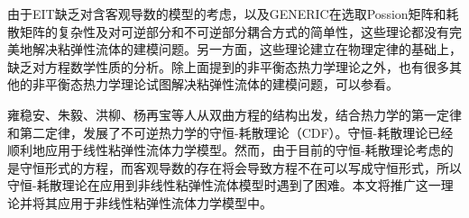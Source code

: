 由于EIT缺乏对含客观导数的模型的考虑，以及GENERIC在选取Possion矩阵和耗散矩阵的复杂性及对可逆部分和不可逆部分耦合方式的简单性，这些理论都没有完美地解决粘弹性流体的建模问题。另一方面，这些理论建立在物理定律的基础上，缺乏对方程数学性质的分析。除上面提到的非平衡态热力学理论之外，也有很多其他的非平衡态热力学理论试图解决粘弹性流体的建模问题，可以参看\cite{stratonovich2012nonlinear,huo1993nonequilibrium,eu1992kinetic}。

雍稳安、朱毅、洪柳、杨再宝等人从双曲方程的结构出发，结合热力学的第一定律和第二定律，发展了不可逆热力学的守恒-耗散理论（CDF）\cite{zhu2014conservation}。守恒-耗散理论已经顺利地应用于线性粘弹性流体力学模型。然而，由于目前的守恒-耗散理论考虑的是守恒形式的方程，而客观导数的存在将会导致方程不在可以写成守恒形式，所以守恒-耗散理论在应用到非线性粘弹性流体模型时遇到了困难。本文将推广这一理论并将其应用于非线性粘弹性流体力学模型中。

